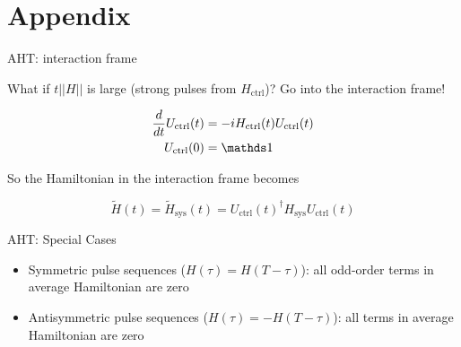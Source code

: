 \documentclass{beamer}
\begin{document}
\section{Appendix}



\begin{frame}{AHT: interaction frame}

What if $t||H||$ is large (strong pulses from $H_{\text{ctrl}}$)? Go into the interaction frame! \cite{brinkmann_2016}

\begin{align*}
    \frac{d}{dt} U_{\text{ctrl}}(t) &=
        -i H_{\text{ctrl}}(t)U_{\text{ctrl}}(t) \\
    U_{\text{ctrl}}(0) &= \identity
\end{align*}

So the Hamiltonian in the interaction frame becomes

\[
    \widetilde{H}(t) = \widetilde{H}_{\text{sys}}(t) = U_{\text{ctrl}}(t)^\dagger H_{\text{sys}} U_{\text{ctrl}}(t)
\]

\end{frame}

\begin{frame}{AHT: Special Cases}

\begin{itemize}

\item
  Symmetric pulse sequences (\(H(\tau) = H(T - \tau)\)): all odd-order
  terms in average Hamiltonian are zero
\item
  Antisymmetric pulse sequences (\(H(\tau) = - H(T - \tau)\)): all
  terms in average Hamiltonian are zero
\end{itemize}
\end{frame}

%
%
\end{document}
